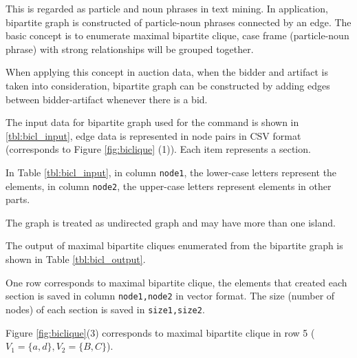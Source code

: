 This is regarded as particle and noun phrases in text mining. In application, bipartite graph is constructed of particle-noun phrases connected by an edge.  
The basic concept is to enumerate maximal bipartite clique, case frame (particle-noun phrase) with strong relationships will be grouped together. 

When applying this concept in auction data, when the bidder and artifact is taken into consideration, bipartite graph can be constructed by adding edges between bidder-artifact whenever there is a bid.  

The input data for bipartite graph used for the command is shown in \ref{tbl:bicl_input}, edge data is represented in node pairs in CSV format (corresponds to Figure \ref{fig:biclique} (1)). Each item represents a section. 

In Table \ref{tbl:bicl_input}, in column \verb|node1|, the lower-case letters represent the elements, in column  \verb|node2|, the upper-case letters represent elements in other parts.   

The graph is treated as undirected graph and may have more than one island.  

The output of maximal bipartite cliques enumerated from the bipartite graph is shown in Table \ref{tbl:bicl_output}. 

One row corresponds to maximal bipartite clique, the elements that created each section is saved in column \verb|node1,node2| in vector format. 
The size (number of nodes) of each section is saved in \verb|size1,size2|. 

Figure \ref{fig:biclique}(3) corresponds to maximal bipartite clique in row 5 ($V_1=\{a,d\},V_2=\{B,C\}$). 

\vspace{1em}

